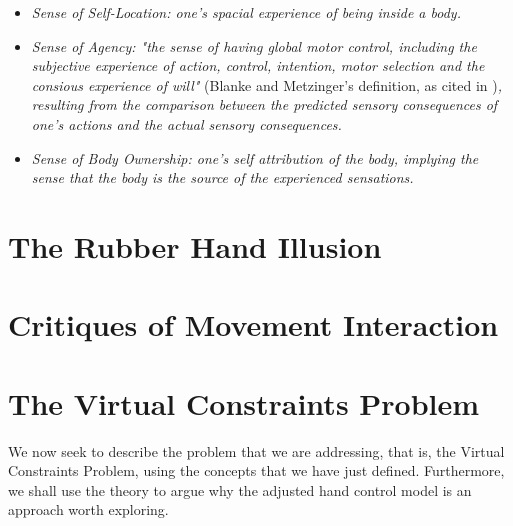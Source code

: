 \begin{displayquote}
\begin{itemize}
\item \textit{Sense of Self-Location: one's spacial experience of being inside a body.}
\item \textit{Sense of Agency: "the sense of having global motor control, including the subjective experience of action, control, intention, motor selection and the consious experience of will"} (Blanke and Metzinger's definition, as cited in \parencite{Kilteni2012})\textit{, resulting from the comparison between the predicted sensory consequences of one's actions and the actual sensory consequences.}
\item \textit{Sense of Body Ownership: one's self attribution of the body, implying the sense that the body is the source of the experienced sensations.}
\end{itemize}
\end{displayquote}

\section{The Rubber Hand Illusion}
\label{sec:rubberHandIllusion}


\section{Critiques of Movement Interaction}
\label{sec:critiquesMovementInteraction}


\section{The Virtual Constraints Problem}
\label{sec:virtualContraintsProblem}

We now seek to describe the problem that we are addressing, that is, the Virtual Constraints Problem, using the concepts that we have just defined. Furthermore, we shall use the theory to argue why the adjusted hand control model is an approach worth exploring.

